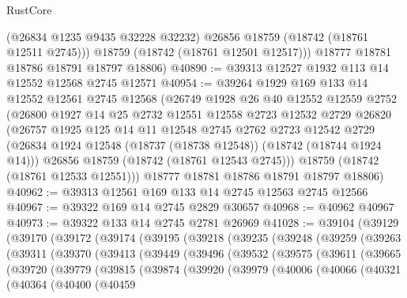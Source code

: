 \begin{lexlean}{RustCore}
\begin{coremodule}
          (@26834 @1235 @9435 @32228 @32232)
          @26856
          @18759
          (@18742 (@18761 @12511 @2745)))
        @18759
        (@18742 (@18761 @12501 @12517)))
      @18777
      @18781
      @18786
      @18791
      @18797
      @18806)
@40890 := @39313 @12527 @1932 @113 @14 @12552 @12568 @2745 @12571
@40954 := @39264
    @1929
    @169
    @133
    @14
    @12552
    @12561
    @2745
    @12568
    (@26749
      @1928
      @26
      @40
      @12552
      @12559
      @2752
      (@26800
        @1927
        @14
        @25
        @2732
        @12551
        @12558
        @2723
        @12532
        @2729
        @26820
        (@26757
          @1925
          @125
          @14
          @11
          @12548
          @2745
          @2762
          @2723
          @12542
          @2729
          (@26834 @1924 @12548 (@18737 (@18738 @12548)) (@18742 (@18744 @1924 @14)))
          @26856
          @18759
          (@18742 (@18761 @12543 @2745)))
        @18759
        (@18742 (@18761 @12533 @12551)))
      @18777
      @18781
      @18786
      @18791
      @18797
      @18806)
@40962 := @39313 @12561 @169 @133 @14 @2745 @12563 @2745 @12566
@40967 := @39322 @169 @14 @2745 @2829 @30657
@40968 := @40962 @40967
@40973 := @39322 @133 @14 @2745 @2781 @26969
@41028 := @39104
    (@39129
      (@39170
        (@39172
          (@39174
            (@39195
              (@39218
                (@39235
                  (@39248
                    (@39259
                      (@39263
                        (@39311
                          (@39370
                            (@39413
                              (@39449
                                (@39496
                                  (@39532
                                    (@39575
                                      (@39611
                                        (@39665
                                          (@39720
                                            (@39779
                                              (@39815
                                                (@39874
                                                  (@39920
                                                    (@39979
                                                      (@40006
                                                        (@40066
                                                          (@40321
                                                            (@40364
                                                              (@40400
                                                                (@40459

\end{coremodule}
\end{lexlean}
